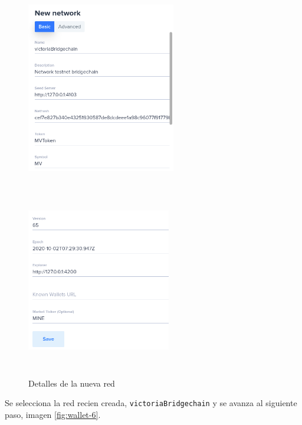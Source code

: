 \begin{figure}[H]
	\centering
	\begin{minipage}{0.4\textwidth}
		\includegraphics[width=6.5cm,height=8.5cm]{figuras/wallet_4.png}
	\end{minipage}\vfill
	\begin{minipage}{0.38\textwidth}
		\includegraphics[width=6.3cm,height=8.5cm]{figuras/wallet_5.png}	
	\end{minipage}
	\caption{Detalles de la nueva red}
	\label{fig:wallet-4-5}
\end{figure}

\newpage
Se selecciona la red recien creada, \texttt{victoriaBridgechain} y se avanza al siguiente paso, imagen \ref{fig:wallet-6}.

